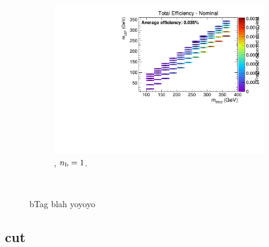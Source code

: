 \begin{figure}[ht!]
\begin{subfigure}[b]{0.32\textwidth}
    \includegraphics[width=\textwidth, page=6]{Figs/sms/t2cc/v24/bTag_T2cc_v24_eq1b_ge4j_incl.pdf}
    \caption{\njhigh, $n_{\text{b}} = 1$.}
  \end{subfigure}\\
  \caption{bTag blah yoyoyo}
  \label{fig:sms-btag-t2cc}
\end{figure}


\newpage
\subsection*{\mhtmet cut}
\label{sec:t2cc_mhtmet_plots}

